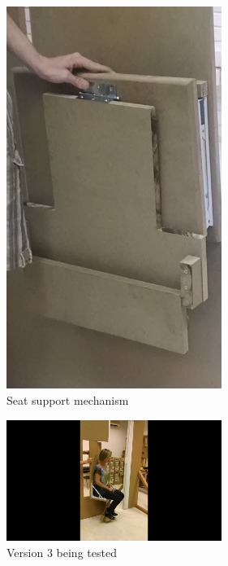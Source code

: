 \begin{figure}[h]
\centering
\includegraphics[width=7cm]{brazil_images/image033.jpg}
\caption{Seat support mechanism}
\label{fig:seat_support_mechanism}
\end{figure}


\begin{figure}[h]
\centering
\includegraphics[width=7cm]{brazil_images/image034.png}
\caption{Version 3 being tested}
\label{fig:version_3_usp}
\end{figure}


